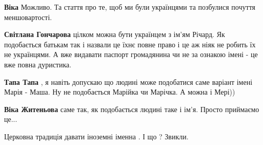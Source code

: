 \begin{itemize}
\begin{itemize}
 
\textbf{Віка} Можливо. Та стаття про те, щоб ми були українцями та позбулися почуття меншовартості.

 
\textbf{Світлана Гончарова} цілком можна бути українцем з ім'ям Річард. Як подобається батькам так і назвали це їхнє повне право і це аж ніяк не робить їх не українцями. А вже видавати паспорт громадянина чи не за ознакою імені - це вже повна дуристика.

 
\textbf{Тапа Тапа} , я навіть допускаю що людині може подобатися саме варіант імені Марія - Маша. Ну не подобається Марійка чи Марічка. А можна і Мері))

 
\textbf{Віка Житеньова} саме так, як подобається людині таке і ім'я. Просто приймаємо це...
\end{itemize}

 
Церковна традиція давати іноземні іменна .
І що ?
Звикли.

 

\end{itemize}
